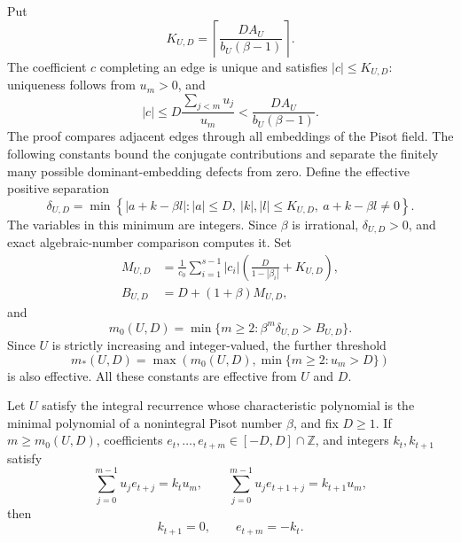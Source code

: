 Put
\begin{equation}
K_{U,D}=\left\lceil\frac{DA_U}{b_U(\beta-1)}\right\rceil.
\label{eq:bounded-zero-carry-bound}
\end{equation}
The coefficient $c$ completing an edge is unique and satisfies
$|c|\le K_{U,D}$: uniqueness follows from $u_m>0$, and
\[
|c|\le D\frac{\sum_{j<m}u_j}{u_m}
 <\frac{DA_U}{b_U(\beta-1)}.
\]
The proof compares adjacent edges through all embeddings of the Pisot field.
The following constants bound the conjugate contributions and separate the
finitely many possible dominant-embedding defects from zero.
Define the effective positive separation
\begin{equation}
\delta_{U,D}=\min\left\{|a+k-\beta l|:
 |a|\le D,\ |k|,|l|\le K_{U,D},\ a+k-\beta l\ne0\right\}.
\label{eq:bounded-zero-separation}
\end{equation}
The variables in this minimum are integers.  Since $\beta$ is irrational,
$\delta_{U,D}>0$, and exact algebraic-number comparison computes it.  Set
\begin{align}
M_{U,D}&=\frac1{c_0}\sum_{i=1}^{s-1}|c_i|
 \left(\frac{D}{1-|\beta_i|}+K_{U,D}\right),\nonumber\\
B_{U,D}&=D+(1+\beta)M_{U,D},
\label{eq:bounded-zero-conjugate-bound}
\end{align}
and
\begin{equation}
m_0(U,D)=\min\{m\ge2:\beta^m\delta_{U,D}>B_{U,D}\}.
\label{eq:bounded-zero-contraction-threshold}
\end{equation}
Since $U$ is strictly increasing and integer-valued, the further threshold
\begin{equation}
m_*(U,D)=\max\left(m_0(U,D),
 \min\{m\ge2:u_m>D\}\right)
\label{eq:bounded-zero-acyclicity-threshold}
\end{equation}
is also effective.  All these constants are effective from $U$ and $D$.

\begin{lemma}
\label{lem:bounded-zero-arbitrary-alphabet-collapse}
Let $U$ satisfy the integral recurrence whose characteristic polynomial is
the minimal polynomial of a nonintegral Pisot number $\beta$, and fix
$D\ge1$.  If $m\ge m_0(U,D)$, coefficients
$e_t,\ldots,e_{t+m}\in[-D,D]\cap\mathbb Z$, and integers $k_t,k_{t+1}$
satisfy
\[
\sum_{j=0}^{m-1}u_je_{t+j}=k_tu_m,
\qquad
\sum_{j=0}^{m-1}u_je_{t+1+j}=k_{t+1}u_m,
\]
then
\[
k_{t+1}=0,\qquad e_{t+m}=-k_t.
\]
\end{lemma}

